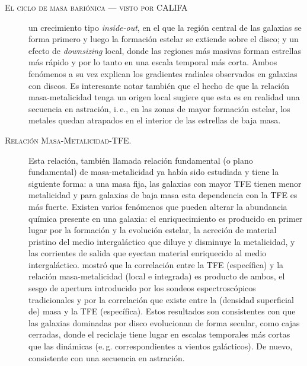 \documentclass[xcolor=dvipsnames,4pt,hyperref={colorlinks,citecolor=black,linkcolor=black,urlcolor=black}]{beamer}
\begin{document}
\begin{frame}[allowframebreaks]{\textsc{El ciclo de masa bariónica --- visto por CALIFA}}
\begin{description}
un crecimiento tipo \emph{inside-out}, en el que la región central de las galaxias se forma primero
y luego la formación estelar se extiende sobre el disco; y un efecto de \emph{downsizing} local,
donde las regiones más masivas forman estrellas más rápido y por lo tanto en una escala temporal más
corta. Ambos fenómenos a su vez explican los gradientes radiales observados en galaxias con discos.
Es interesante notar también que el hecho de que la relación masa-metalicidad tenga un origen local
sugiere que esta es en realidad una secuencia en astración, i.\,e., en las zonas de mayor formación
estelar, los metales quedan atrapados en el interior de las estrellas de baja masa.

\item[\textsc{Relación Masa-Metalicidad-TFE.}] Esta relación, también llamada relación fundamental
(o plano fundamental) de masa-metalicidad ya había sido estudiada \citep{Lara-Lopez2010} y tiene la
siguiente forma: a una masa fija, las galaxias con mayor TFE tienen menor metalicidad y para
galaxias de baja masa esta dependencia con la TFE es más fuerte. Existen varios fenómenos que pueden
alterar la abundancia química presente en una galaxia: el enriquecimiento es producido en primer
lugar por la formación y la evolución estelar, la acreción de material pristino del medio
intergaláctico que diluye y disminuye la metalicidad, y las corrientes de salida que eyectan
material enriquecido al medio intergaláctico.
%
\citet{Sanchez2013} mostró que la correlación entre la
TFE (específica) y la relación masa-metalicidad (local e integrada) es producto de ambos, el sesgo
de apertura introducido por los sondeos espectroscópicos tradicionales y por la correlación que
existe entre la (densidad superficial de) masa y la TFE (específica). Estos resultados son
consistentes con que las galaxias dominadas por disco evolucionan de forma secular, como cajas
cerradas, donde el reciclaje tiene lugar en escalas temporales más cortas que las dinámicas (e.\,g.
correspondientes a vientos galácticos). De nuevo, consistente con una secuencia en astración.
%
\end{description}

\end{frame}
\end{document}
